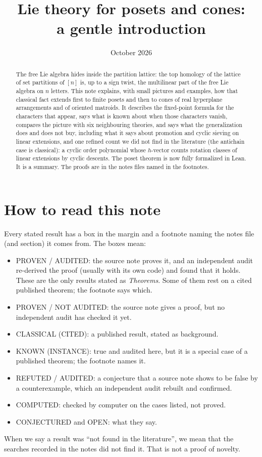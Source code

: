 \documentclass[11pt]{article}
\title{Lie theory for posets and cones:\\ a gentle introduction}
\author{}
\date{October 2026}
\theoremstyle{definition}
\theoremstyle{remark}
\begin{document}
\maketitle

\begin{abstract}
The free Lie algebra hides inside the partition lattice: the top homology of
the lattice of set partitions of $[n]$ is, up to a sign twist, the
multilinear part of the free Lie algebra on $n$ letters. This note explains,
with small pictures and examples, how that classical fact extends first to
finite posets and then to cones of real hyperplane arrangements and of
oriented matroids. It describes the fixed-point formula for the characters
that appear, says what is known about when those characters vanish, compares
the picture with six neighbouring theories, and says what the
generalization does and does not buy, including what it says about
promotion and cyclic sieving on linear extensions, and one refined
count we did not find in the literature (the antichain case is classical):
a cyclic order polynomial whose $h$-vector counts
rotation classes of linear extensions by cyclic descents. The poset theorem is
now fully formalized in Lean. It is a summary. The proofs are in
the notes files named in the footnotes.
\end{abstract}

\section*{How to read this note}

Every stated result has a box in the margin and a footnote naming the
notes file (and section) it comes from. The boxes mean:
\begin{itemize}
\item \textsf{PROVEN / AUDITED}: the source note proves it, and an
  independent audit re-derived the proof (usually with its own code) and
  found that it holds. These are the only results stated as
  \emph{Theorems}. Some of them rest on a cited published theorem; the
  footnote says which.
\item \textsf{PROVEN / NOT AUDITED}: the source note gives a proof, but no
  independent audit has checked it yet.
\item \textsf{CLASSICAL (CITED)}: a published result, stated as background.
\item \textsf{KNOWN (INSTANCE)}: true and audited here, but it is a special
  case of a published theorem; the footnote names it.
\item \textsf{REFUTED / AUDITED}: a conjecture that a source note shows to
  be false by a counterexample, which an independent audit rebuilt and
  confirmed.
\item \textsf{COMPUTED}: checked by computer on the cases listed, not proved.
\item \textsf{CONJECTURED} and \textsf{OPEN}: what they say.
\end{itemize}
When we say a result was ``not found in the literature'', we mean that the
searches recorded in the notes did not find it. That is not a proof of
novelty.
\end{document}
